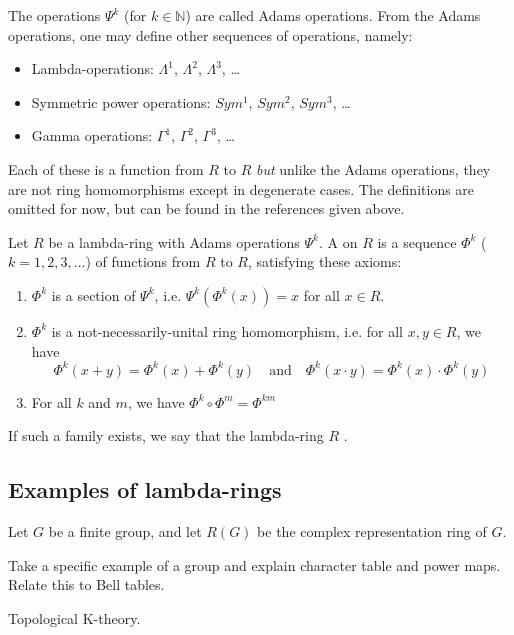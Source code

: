 The operations $\Psi^k$ (for $k \in \mathbb{N}$) are called Adams operations. From the Adams operations, one may define other sequences of operations, namely:
\begin{itemize}
\item Lambda-operations: $\Lambda^1$, $\Lambda^2$, $\Lambda^3$, \ldots
\item Symmetric power operations: $Sym^1$, $Sym^2$, $Sym^3$, \ldots
\item Gamma operations: $\Gamma^1$, $\Gamma^2$, $\Gamma^3$, \ldots
\end{itemize}
Each of these is a function from $R$ to $R$ \emph{but} unlike the Adams operations, they are not ring homomorphisms except in degenerate cases. The definitions are omitted for now, but can be found in the references given above.

\begin{definition}
Let $R$ be a lambda-ring with Adams operations $\Psi^k$. A  on $R$ is a sequence $\Phi^k$ ($k = 1, 2, 3, \ldots$) of functions from $R$ to $R$, satisfying these axioms:
\begin{enumerate}
\item $\Phi^k$ is a section of $\Psi^k$, i.e. $\Psi^k(\Phi^k(x)) = x$ for all $x \in R$.
\item $\Phi^k$ is a not-necessarily-unital ring homomorphism, i.e. for all $x, y \in R$, we have
$$ \Phi^k(x+y) = \Phi^k(x) + \Phi^k(y) \quad \textrm{and} \quad \Phi^k(x\cdot y) = \Phi^k(x)\cdot \Phi^k(y) $$
\item For all $k$ and $m$, we have $\Phi^k \circ \Phi^m = \Phi^{km}$
\end{enumerate}
If such a family exists, we say that the lambda-ring $R$ .
\end{definition}


\subsection{Examples of lambda-rings}




\begin{example}
Let $G$ be a finite group, and let $R(G)$ be the complex representation ring of $G$.

Take a specific example of a group and explain character table and power maps. Relate this to Bell tables.
\end{example}

\begin{example}
Topological K-theory.
\end{example}

